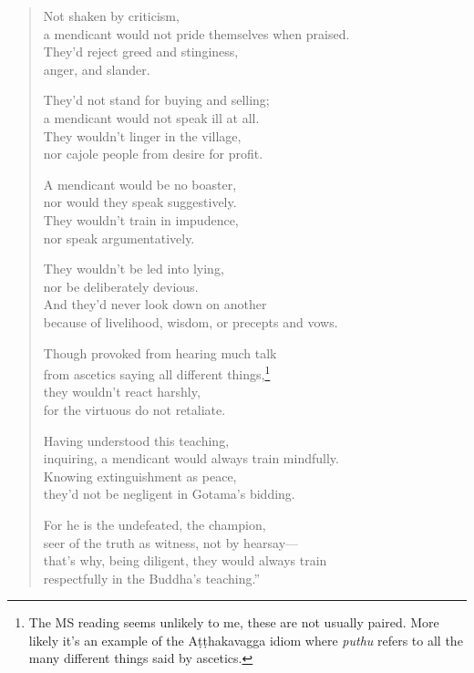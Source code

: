 \documentclass[12pt,openany]{book}%
\begin{document}
\begin{verse}
Not shaken by criticism, \\
a mendicant would not pride themselves when praised. \\
They’d reject greed and stinginess, \\
anger, and slander. 

They’d not stand for buying and selling; \\
a mendicant would not speak ill at all. \\
They wouldn’t linger in the village, \\
nor cajole people from desire for profit. 

A mendicant would be no boaster, \\
nor would they speak suggestively. \\
They wouldn’t train in impudence, \\
nor speak argumentatively. 

They wouldn’t be led into lying, \\
nor be deliberately devious. \\
And they’d never look down on another \\
because of livelihood, wisdom, or precepts and vows. 

Though provoked from hearing much talk \\
from ascetics saying all different things,\footnote{The MS reading seems unlikely to me, these are not usually paired. More likely it’s an example of the \textsanskrit{Aṭṭhakavagga} idiom where \textit{puthu} refers to all the many different things said by ascetics. } \\
they wouldn’t react harshly, \\
for the virtuous do not retaliate. 

Having understood this teaching, \\
inquiring, a mendicant would always train mindfully. \\
Knowing extinguishment as peace, \\
they’d not be negligent in Gotama’s bidding. 

For he is the undefeated, the champion, \\
seer of the truth as witness, not by hearsay—\\
that’s why, being diligent, they would always train \\
respectfully in the Buddha’s teaching.” 

%
\end{verse}
\end{document}
